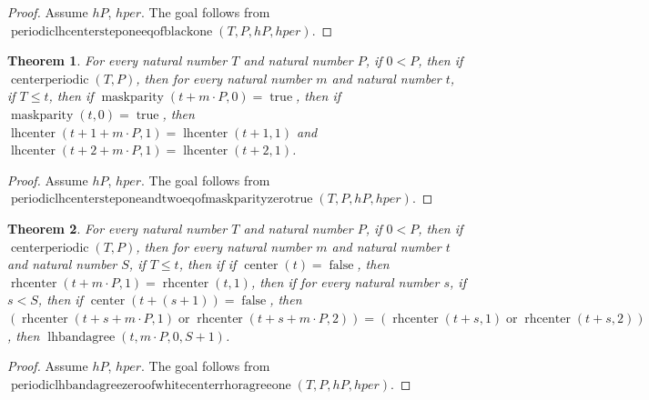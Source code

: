 \documentclass[11pt]{article}
\newtheorem{theorem}{Theorem}[section]
\theoremstyle{definition}
\begin{document}
\begin{proof}
Assume \(hP\), \(hper\).
The goal follows from \(\operatorname{periodiclhcentersteponeeqofblackone}(T, P, hP, hper)\).
\end{proof}
\begin{theorem}
\label{ll:paper:periodic-lhcenter-step-one-and-two-eq-of-maskparity-zero-true}
For every natural number \(T\) and natural number \(P\), if \(0 < P\), then if \(\operatorname{centerperiodic}(T, P)\), then for every natural number \(m\) and natural number \(t\), if \(T \le t\), then if \(\operatorname{maskparity}(t + m \cdot P, 0) = \operatorname{true}\), then if \(\operatorname{maskparity}(t, 0) = \operatorname{true}\), then \(\operatorname{lhcenter}(t + 1 + m \cdot P, 1) = \operatorname{lhcenter}(t + 1, 1)\) and \(\operatorname{lhcenter}(t + 2 + m \cdot P, 1) = \operatorname{lhcenter}(t + 2, 1)\).
\end{theorem}
\begin{proof}
Assume \(hP\), \(hper\).
The goal follows from \(\operatorname{periodiclhcentersteponeandtwoeqofmaskparityzerotrue}(T, P, hP, hper)\).
\end{proof}
\begin{theorem}
\label{ll:paper:periodic-lhbandagree-zero-of-white-center-rhoragree-one}
For every natural number \(T\) and natural number \(P\), if \(0 < P\), then if \(\operatorname{centerperiodic}(T, P)\), then for every natural number \(m\) and natural number \(t\) and natural number \(S\), if \(T \le t\), then if if \(\operatorname{center}(t) = \operatorname{false}\), then \(\operatorname{rhcenter}(t + m \cdot P, 1) = \operatorname{rhcenter}(t, 1)\), then if for every natural number \(s\), if \(s < S\), then if \(\operatorname{center}(t + (s + 1)) = \operatorname{false}\), then \((\operatorname{rhcenter}(t + s + m \cdot P, 1) \operatorname{or} \operatorname{rhcenter}(t + s + m \cdot P, 2)) = (\operatorname{rhcenter}(t + s, 1) \operatorname{or} \operatorname{rhcenter}(t + s, 2))\), then \(\operatorname{lhbandagree}(t, m \cdot P, 0, S + 1)\).
\end{theorem}
\begin{proof}
Assume \(hP\), \(hper\).
The goal follows from \(\operatorname{periodiclhbandagreezeroofwhitecenterrhoragreeone}(T, P, hP, hper)\).
\end{proof}
\end{document}
